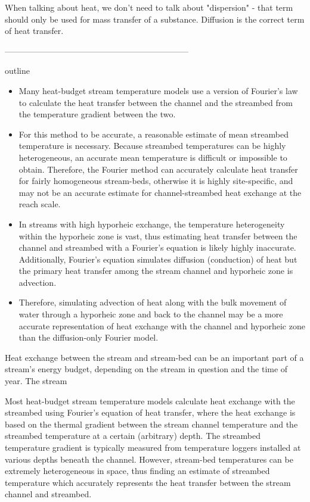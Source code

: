 \documentclass[a4paper]{article}
\begin{document}
When talking about heat, we don't need to talk about "dispersion" - that term should only be used for mass transfer of a substance. Diffusion is the correct term of heat transfer.

------------------------------------------------------------------

outline
\begin{itemize}
    \item Many heat-budget stream temperature models use a version of Fourier's law to calculate the heat transfer between the channel and the streambed from the temperature gradient between the two.
    \item For this method to be accurate, a reasonable estimate of mean streambed temperature is necessary. Because streambed temperatures can be highly heterogeneous, an accurate mean temperature is difficult or impossible to obtain. Therefore, the Fourier method can accurately calculate heat transfer for fairly homogeneous stream-beds, otherwise it is highly site-specific, and may not be an accurate estimate for channel-streambed heat exchange at the reach scale.   
    \item In streams with high hyporheic exchange, the temperature heterogeneity within the hyporheic zone is vast, thus estimating heat transfer between the channel and streambed with a Fourier's equation is likely highly inaccurate. Additionally, Fourier's equation simulates diffusion (conduction) of heat but the primary heat transfer among the stream channel and hyporheic zone is advection.
    \item Therefore, simulating advection of heat along with the bulk movement of water through a hyporheic zone and back to the channel may be a more accurate representation of heat exchange with the channel and hyporheic zone than the diffusion-only Fourier model.
\end{itemize}



Heat exchange between the stream and stream-bed can be an important part of a stream's energy budget, depending on the stream in question and the time of year. The stream

Most heat-budget stream temperature models calculate heat exchange with the streambed using Fourier's equation of heat transfer, where the heat exchange is based on the thermal gradient between the stream channel temperature and the streambed temperature at a certain (arbitrary) depth. The streambed temperature gradient is typically measured from temperature loggers installed at various depths beneath the channel. However, stream-bed temperatures can be extremely heterogeneous in space, thus finding an estimate of streambed temperature which accurately represents the heat transfer between the stream channel and streambed.
\end{document}
